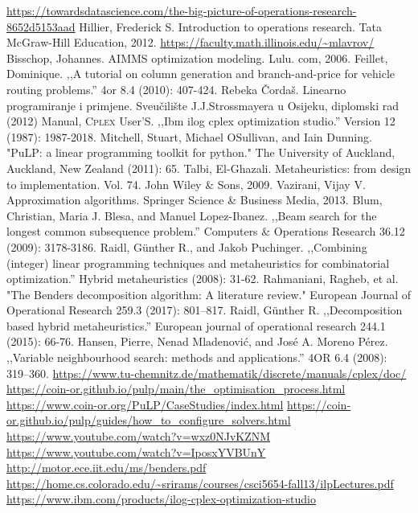 \documentclass[a4paper, utf8, 11pt, colorlinks]{book}
\theoremstyle{definition}
\begin{document}
\begin{thebibliography}{widest entry}
	  \url{https://towardsdatascience.com/the-big-picture-of-operations-research-8652d5153aad}
	 Hillier, Frederick S. Introduction to operations research. Tata McGraw-Hill Education, 2012.
	  \url{https://faculty.math.illinois.edu/~mlavrov/}
	   Bisschop, Johannes. AIMMS optimization modeling. Lulu. com, 2006.
	   Feillet, Dominique. ,,A tutorial on column generation and branch-and-price for vehicle routing problems.'' 4or 8.4 (2010): 407-424.
	    Rebeka Čordaš. Linearno programiranje i primjene. Sveu\v cili\v ste J.J.Strossmayera u Osijeku, diplomski rad (2012)
	     Manual, \textsc{Cplex} User’S. ,,Ibm ilog cplex optimization studio.'' Version 12 (1987): 1987-2018.
	   Mitchell, Stuart, Michael OSullivan, and Iain Dunning. "PuLP: a linear programming toolkit for python." The University of Auckland, Auckland, New Zealand (2011): 65.
	      Talbi, El-Ghazali. Metaheuristics: from design to implementation. Vol. 74. John Wiley \& Sons, 2009.
	       Vazirani, Vijay V. Approximation algorithms. Springer Science \& Business Media, 2013.
	        Blum, Christian, Maria J. Blesa, and Manuel Lopez-Ibanez. ,,Beam search for the longest common subsequence problem.'' Computers \& Operations Research 36.12 (2009): 3178-3186.
	      Raidl, Günther R., and Jakob Puchinger. ,,Combining (integer) linear programming techniques and metaheuristics for combinatorial optimization.'' Hybrid metaheuristics (2008): 31-62.
	           Rahmaniani, Ragheb, et al. "The Benders decomposition algorithm: A literature review." European Journal of Operational Research 259.3 (2017): 801--817.
	         Raidl, Günther R. ,,Decomposition based hybrid metaheuristics.'' European journal of operational research 244.1 (2015): 66-76.
	        Hansen, Pierre, Nenad Mladenović, and José A. Moreno Pérez. ,,Variable neighbourhood search: methods and applications.'' 4OR 6.4 (2008): 319--360.
	       \url{https://www.tu-chemnitz.de/mathematik/discrete/manuals/cplex/doc/}%
	       \url{https://coin-or.github.io/pulp/main/the\_optimisation\_process.html}
	       \url{https://www.coin-or.org/PuLP/CaseStudies/index.html}
	        \url{https://coin-or.github.io/pulp/guides/how\_to\_configure\_solvers.html}
            \url{https://www.youtube.com/watch?v=wxz0NJvKZNM}
            \url{https://www.youtube.com/watch?v=IposxYVBUnY}
             \url{http://motor.ece.iit.edu/ms/benders.pdf}
             \url{https://home.cs.colorado.edu/\~srirams/courses/csci5654-fall13/ilpLectures.pdf}
    \url{https://www.ibm.com/products/ilog-cplex-optimization-studio}
  

\end{thebibliography}
\end{document}
